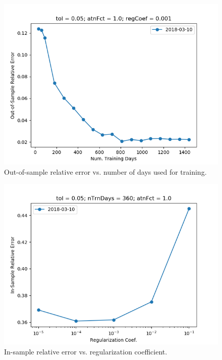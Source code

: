 \documentclass{article}
\begin{document}
\begin{figure}\label{fig:nTrnDays-sensitivity-oos-error}
\includegraphics[width = \textwidth]{figures/nTrnDays-sensitivity-oos-error.png}
\caption{Out-of-sample relative error vs. number of days used for training.}
\end{figure}

\begin{figure}\label{fig:regCoef-sensitivity-error}
\includegraphics[width = \textwidth]{figures/regCoef-sensitivity-error.png}
\caption{In-sample relative error vs. regularization coefficient.}
\end{figure}
\end{document}
